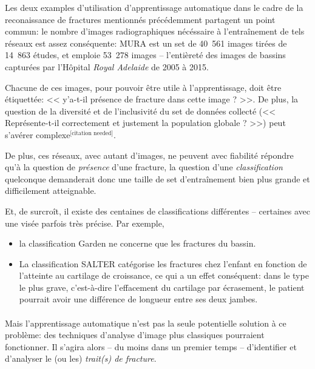 \documentclass[a4paper]{article}
\begin{document}
Les deux examples d'utilisation d'apprentissage automatique dans le cadre de la reconaissance de fractures mentionnés
précédemment partagent un point commun: le nombre d'images radiographiques nécéssaire à l'entraînement de tels réseaux
est assez conséquente: MURA\cite{mura-competition} est un set de 40~561 images tirées de 14~863 études, et
\cite{detect-hip} emploie 53~278 images -- l'entièreté des images de bassins capturées par l'Hôpital \emph{Royal
Adelaide} de 2005 à 2015.


Chacune de ces images, pour pouvoir être utile à l'apprentissage, doit être étiquettée: << y'a-t-il présence de fracture
dans cette image ? >>. De plus, la question de la diversité et de l'inclusivité du set de données collecté 
(<< Représente-t-il correctement et justement la population globale ? >>) peut s'avérer complexe$^\text{[citation needed]}$.

De plus, ces réseaux, avec autant d'images, ne peuvent avec fiabilité répondre qu'à la question de \emph{présence} d'une
fracture, la question d'une \emph{classification} quelconque demanderait donc une taille de set d'entraînement bien plus
grande et difficilement atteignable.

Et, de surcroît, il existe des centaines de classifications différentes -- certaines avec une visée parfois très précise.  Par
exemple, 

\begin{itemize}
    \item la classification Garden\cite{garden-paper} ne concerne que les fractures du bassin.
    \item La classification SALTER\cite{salter} catégorise les fractures chez l'enfant en
    fonction de l'atteinte au cartilage de croissance, ce qui a un effet conséquent: dans le type le plus grave,
    c'est-à-dire l'effacement du cartilage par écrasement, le patient pourrait avoir une différence de longueur entre
    ses deux jambes.
\end{itemize}

\paragraph{}

Mais l'apprentissage automatique n'est pas la seule potentielle solution à ce problème: des techniques d'analyse d'image
plus classiques pourraient fonctionner.  Il s'agira alors -- du moins dans un premier temps -- d'identifier et
d'analyser le (ou les) \emph{trait(s) de fracture}.
\end{document}
